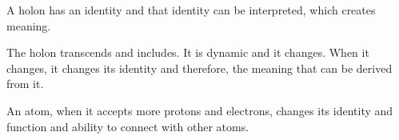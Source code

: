 











A holon has an identity and that identity can be interpreted, which creates meaning. 

The holon transcends and includes. It is dynamic and it changes. When it changes, it changes its identity and therefore, the meaning that can be derived from it. 

An atom, when it accepts more protons and electrons, changes its identity and function and ability to connect with other atoms.





